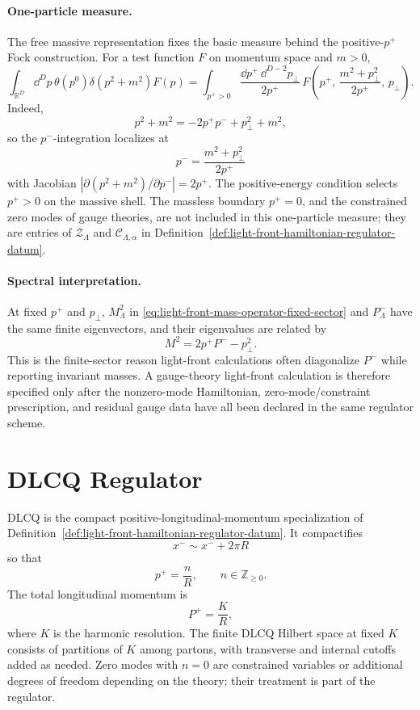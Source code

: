 \paragraph{One-particle measure.}
The free massive representation fixes the basic measure behind the
positive-\(p^+\) Fock construction.  For a test function \(F\) on momentum
space and \(m>0\),
\begin{equation}
  \int_{\mathbb R^D}\dd^Dp\,
  \theta(p^0)\delta(p^2+m^2)F(p)
  =
  \int_{p^+>0}
  \frac{\dd p^+\,\dd^{D-2}p_\perp}{2p^+}\,
  F\!\left(p^+,\,\frac{m^2+p_\perp^2}{2p^+},\,p_\perp\right).
  \label{eq:light-front-one-particle-measure}
\end{equation}
Indeed,
\[
  p^2+m^2=-2p^+p^-+p_\perp^2+m^2,
\]
so the \(p^-\)-integration localizes at
\begin{equation}
  p^-=\frac{m^2+p_\perp^2}{2p^+}
  \label{eq:light-front-mass-shell-relation}
\end{equation}
with Jacobian \(|\partial(p^2+m^2)/\partial p^-|=2p^+\).  The
positive-energy condition selects \(p^+>0\) on the massive shell.  The
massless boundary \(p^+=0\), and the constrained zero modes of gauge
theories, are not included in this one-particle measure; they are entries of
\(\mathcal Z_\Lambda\) and \(\mathcal C_{\Lambda,\alpha}\) in
Definition~\ref{def:light-front-hamiltonian-regulator-datum}.

\paragraph{Spectral interpretation.}
At fixed \(p^+\) and \(p_\perp\), \(M_\Lambda^2\) in
\eqref{eq:light-front-mass-operator-fixed-sector} and \(P^-_\Lambda\) have
the same finite eigenvectors, and their eigenvalues are related by
\[
  M^2=2p^+P^- -p_\perp^2.
\]
This is the finite-sector reason light-front calculations often diagonalize
\(P^-\) while reporting invariant masses.  A gauge-theory light-front
calculation is therefore specified only after the nonzero-mode Hamiltonian,
zero-mode/constraint prescription, and residual gauge data have all been
declared in the same regulator scheme.

\section{DLCQ Regulator}

DLCQ is the compact positive-longitudinal-momentum specialization of
Definition~\ref{def:light-front-hamiltonian-regulator-datum}.  It
compactifies
\[
  x^-\sim x^-+2\pi R
\]
so that
\[
  p^+=\frac{n}{R},\qquad n\in\mathbb Z_{\ge0}.
\]
The total longitudinal momentum is
\[
  P^+=\frac{K}{R},
\]
where \(K\) is the harmonic resolution.  The finite DLCQ Hilbert space at
fixed \(K\) consists of partitions of \(K\) among partons, with transverse and
internal cutoffs added as needed.  Zero modes with \(n=0\) are constrained
variables or additional degrees of freedom depending on the theory; their
treatment is part of the regulator.

